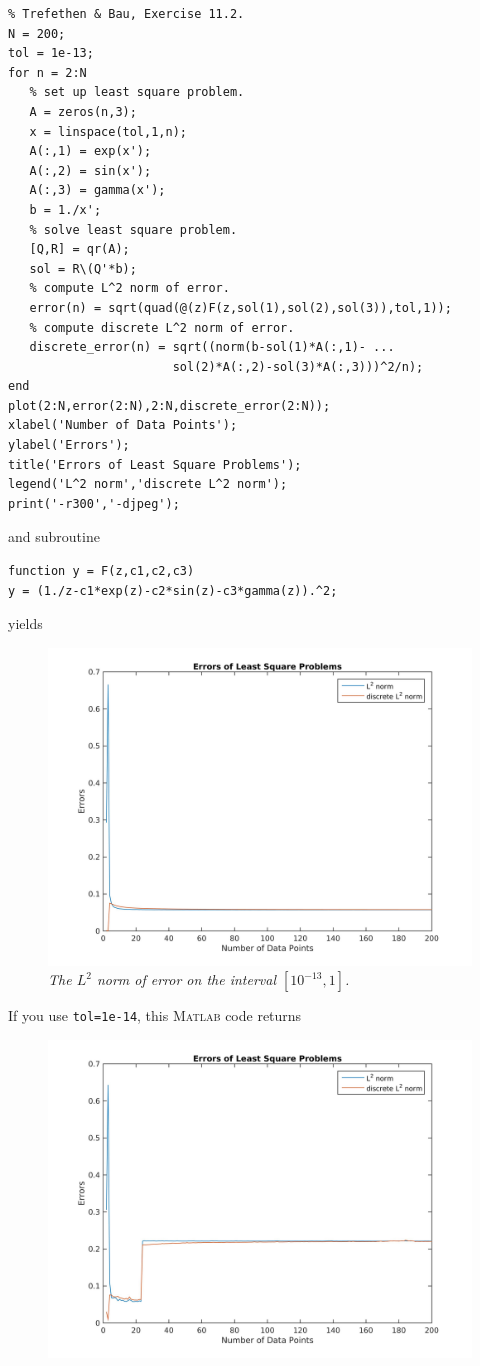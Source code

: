 \documentclass[a4paper,oneside]{book}
\numberwithin{equation}{chapter}
\begin{document}
\begin{enumerate}
\begin{verbatim}
% Trefethen & Bau, Exercise 11.2.
N = 200;
tol = 1e-13;
for n = 2:N
   % set up least square problem.
   A = zeros(n,3);
   x = linspace(tol,1,n);
   A(:,1) = exp(x');
   A(:,2) = sin(x');
   A(:,3) = gamma(x');
   b = 1./x';
   % solve least square problem.
   [Q,R] = qr(A);
   sol = R\(Q'*b);
   % compute L^2 norm of error.
   error(n) = sqrt(quad(@(z)F(z,sol(1),sol(2),sol(3)),tol,1));
   % compute discrete L^2 norm of error.
   discrete_error(n) = sqrt((norm(b-sol(1)*A(:,1)- ...
                       sol(2)*A(:,2)-sol(3)*A(:,3)))^2/n);
end
plot(2:N,error(2:N),2:N,discrete_error(2:N));
xlabel('Number of Data Points');
ylabel('Errors');
title('Errors of Least Square Problems');
legend('L^2 norm','discrete L^2 norm');
print('-r300','-djpeg');
\end{verbatim}
and subroutine
\begin{verbatim}
function y = F(z,c1,c2,c3)
y = (1./z-c1*exp(z)-c2*sin(z)-c3*gamma(z)).^2;
\end{verbatim}
yields
\begin{figure}[H]
	\centering
	\includegraphics[scale=0.14]{2}
	\caption{\textit{The $L^2$ norm of error on the interval $\left[10^{-13},1\right]$.}}
\end{figure}
If you use \texttt{tol=1e-14}, this \textsc{Matlab} code returns
\begin{figure}[H]
	\centering
	\includegraphics[scale=0.14]{3}

\end{figure}
\end{enumerate}
\end{document}
